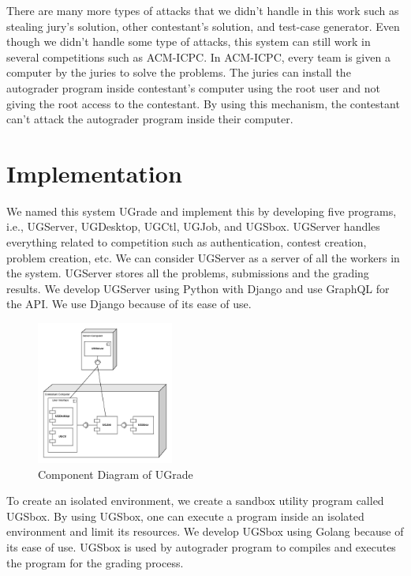 \documentclass[conference]{IEEEtran}
\begin{document}
There are many more types of attacks that we didn't handle in this work such as stealing jury's solution, other contestant's solution, and test-case generator. Even though we didn't handle some type of attacks, this system can still work in several competitions such as ACM-ICPC. In ACM-ICPC, every team is given a computer by the juries to solve the problems. The juries can install the autograder program inside contestant's computer using the root user and not giving the root access to the contestant. By using this mechanism, the contestant can't attack the autograder program inside their computer.

\section{Implementation}

We named this system UGrade and implement this by developing five programs, i.e., UGServer, UGDesktop, UGCtl, UGJob, and UGSbox. UGServer handles everything related to competition such as authentication, contest creation, problem creation, etc. We can consider UGServer as a server of all the workers in the system. UGServer stores all the problems, submissions and the grading results. We develop UGServer using Python with Django and use GraphQL for the API. We use Django because of its ease of use.

\begin{figure}[htbp]
\centerline{\includegraphics[width=0.4\textwidth]{images/paper-component.jpeg}}
\caption{Component Diagram of UGrade}
\label{component}
\end{figure}

To create an isolated environment, we create a sandbox utility program called UGSbox. By using UGSbox, one can execute a program inside an isolated environment and limit its resources. We develop UGSbox using Golang because of its ease of use. UGSbox is used by autograder program to compiles and executes the program for the grading process.
\end{document}

